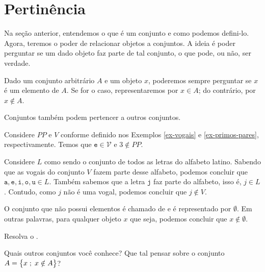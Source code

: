 \section{Pertinência}

Na seção anterior, entendemos o que é um conjunto e como podemos defini-lo. Agora, teremos o poder de relacionar objetos a conjuntos. A ideia é poder perguntar se um dado objeto faz parte de tal conjunto, o que pode, ou não, ser verdade.

\begin{definition}
\label{def:in}
Dado um conjunto arbitrário $A$ e um objeto $x$,
poderemos sempre perguntar se $x$ é um elemento de $A$. Se for o caso, representaremos por $x \in A$; do contrário, por $x \notin A$.
\end{definition}

\begin{remark}
Conjuntos também podem pertencer a outros conjuntos.
\end{remark}

\begin{example}
Considere $PP$ e $V$ conforme definido nos Exemplos \ref{ex-vogais} e \ref{ex-primos-pares}, respectivamente. Temos que $\texttt{e} \in \mathcal{V}$ e $3 \notin PP$.
\end{example}

\begin{example}
Considere $L$ como sendo o conjunto de todos as letras do alfabeto latino.
Sabendo que as vogais do conjunto $V$ fazem parte desse alfabeto, podemos concluir que $\texttt a, \texttt e, \texttt i, \texttt o, \texttt u \in L$.
Também sabemos que a letra $\texttt j$ faz parte do alfabeto, isso é, $j \in L$.
Contudo, como $j$ não é uma vogal, podemos concluir que $j \notin V$.

\end{example}

\begin{definition}
\label{def:emptyset}
O conjunto que não possui elementos é chamado de  e é representado por $\emptyset$.
Em outras palavras, para qualquer objeto $x$ que seja, podemos concluir que $x \notin \emptyset$.
\end{definition}

\begin{homework}
Resolva o .
\end{homework}

\begin{example}
Quais outros conjuntos você conhece? Que tal pensar sobre o conjunto $A = \left\{ x \;;\; x \notin A\right\}$?
\end{example}

